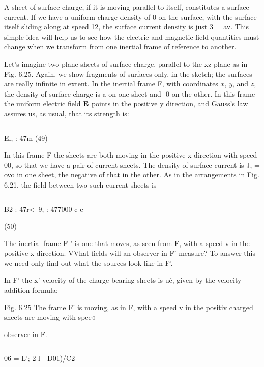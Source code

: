 A sheet of surface charge, if it is moving parallel to itself, constitutes
a surface current. If we have a uniform charge density of 0
on the surface, with the surface itself sliding along at speed 12, the
surface current density is just 3 = av. This simple idea will help us
to see how the electric and magnetic field quantities must change
when we transform from one inertial frame of reference to another.

Let's imagine two plane sheets of surface charge, parallel to the
xz plane as in Fig. 6.25. Again, we show fragments of surfaces only,
in the sketch; the surfaces are really infinite in extent. In the inertial
frame F, with coordinates $x$, $y$, and $z$, the density of surface charge
is a on one sheet and -0 on the other. In this frame the uniform
electric field $\mathbf{E}$ points in the positive y direction, and Gauss's law
assures us, as usual, that its strength is:

\begin{equation}
\end{equation}

El, : 47m (49)

In this frame F the sheets are both moving in the positive x direction
with speed 00, so that we have a pair of current sheets. The
density of surface current is J, = ovo in one sheet, the negative of
that in the other. As in the arrangements in Fig. 6.21, the field between
two such current sheets is

\begin{equation}
\end{equation}

B2 : 47r<~9, : 477000
c c

(50)

The inertial frame F ' is one that moves, as seen from F, with a speed
v in the positive x direction. VVhat fields will an observer in F'
measure? To answer this we need only find out what the sources look
like in F'.

In F' the x' velocity of the charge-bearing sheets is ué, given by
the velocity addition formula:

 

Fig. 6.25 The frame F' is moving, as
in F, with a speed v in the positiv
charged sheets are moving with spee«

observer in F.

\begin{equation}
\end{equation}

06 = L'; 2
l - D01)/C2

